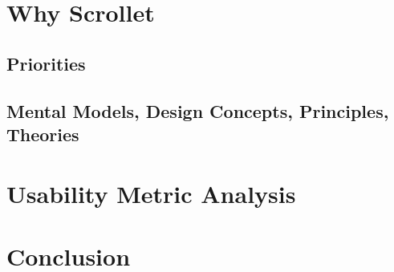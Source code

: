 \documentclass[a4paper]{article}
\begin{document}
\section{Why Scrollet}

\subsection{Priorities}
\subsection{Mental Models, Design Concepts, Principles, Theories}

\section{Usability Metric Analysis}

\section{Conclusion}



\end{document}
